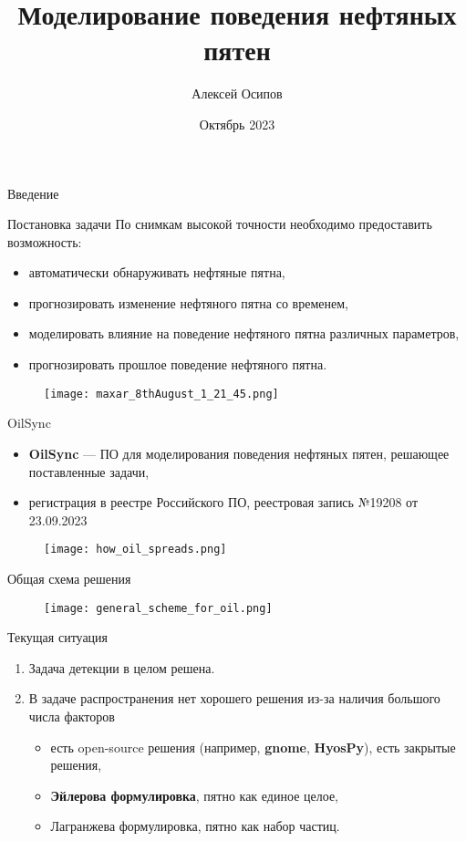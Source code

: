 \documentclass{beamer}
\title{Моделирование поведения нефтяных пятен}
\author{
	Алексей Осипов\inst{1}
}
\institute{
	\inst{1}
	Синкретис
}
\date{Октябрь 2023}
\begin{document}
\begin{frame}
\titlepage
\end{frame}	
\begin{section}{Введение}
\begin{frame}{Постановка задачи}
По снимкам высокой точности необходимо предоставить возможность:
\begin{itemize}
	\item автоматически обнаруживать нефтяные пятна,
	\item прогнозировать изменение нефтяного пятна со временем,
	\item моделировать влияние на поведение нефтяного пятна различных параметров,
	\item прогнозировать прошлое поведение нефтяного пятна.
\end{itemize}

\begin{figure}[H]
	\centering
	\texttt{[image: maxar\_8thAugust\_1\_21\_45.png]}
\end{figure}
\end{frame}
\begin{frame}{OilSync}
\begin{itemize}
	\item \textbf{OilSync} --- ПО для моделирования поведения нефтяных пятен, решающее поставленные задачи,
	\item регистрация в реестре Российского ПО, реестровая запись №19208 от 23.09.2023
\end{itemize}

\begin{figure}[H]
	\centering
	\texttt{[image: how\_oil\_spreads.png]}
\end{figure}
\end{frame}

\begin{frame}{Общая схема решения}

\begin{figure}[H]
	\centering
	\texttt{[image: general\_scheme\_for\_oil.png]}
\end{figure}
	
\end{frame}

\begin{frame}{Текущая ситуация}
		
\begin{enumerate}
	\item Задача детекции в целом решена.
	\item В задаче распространения нет хорошего решения из-за наличия большого числа факторов
	\begin{itemize}
		\item есть open-source решения (например, \textbf{gnome}, \textbf{HyosPy}), есть закрытые решения,
		\item \textbf{Эйлерова формулировка}, пятно как единое целое,
		\item Лагранжева формулировка, пятно как набор частиц.
	\end{itemize}
\end{enumerate}


\end{frame}
\end{section}
\end{document}
